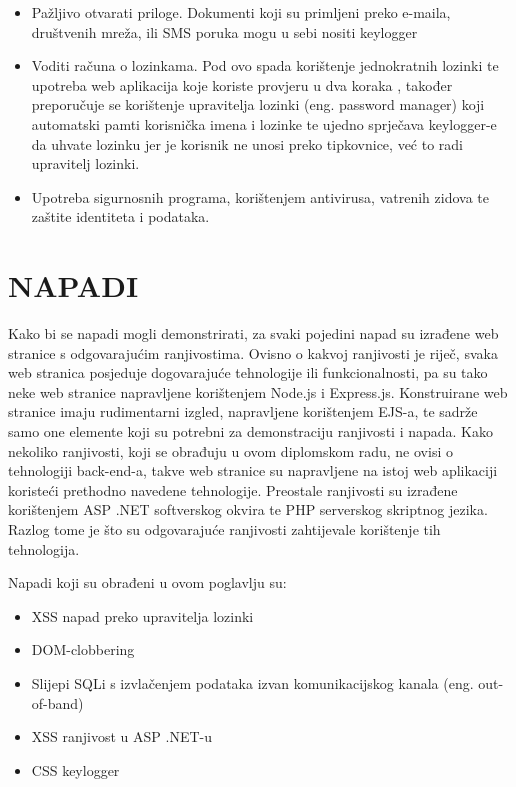 \documentclass[12pt, oneside, onecolumn]{book}
\begin{document}
{\begin{itemize}
\item Pažljivo otvarati priloge. Dokumenti koji su primljeni preko e-maila, društvenih mreža, ili SMS poruka mogu u sebi nositi keylogger
\item Voditi računa o lozinkama. Pod ovo spada korištenje jednokratnih lozinki te upotreba web aplikacija koje koriste provjeru u dva koraka , također preporučuje se korištenje upravitelja lozinki (eng. password manager) koji automatski pamti korisnička imena i lozinke te ujedno sprječava keylogger-e da uhvate lozinku jer je korisnik ne unosi preko tipkovnice, već to radi upravitelj lozinki.
\item Upotreba sigurnosnih programa, korištenjem antivirusa, vatrenih zidova te zaštite identiteta i podataka.
\end{itemize}

\chapter{NAPADI}

Kako bi se napadi mogli demonstrirati, za svaki pojedini napad su izrađene web stranice s odgovarajućim ranjivostima. Ovisno o kakvoj ranjivosti je riječ, svaka web stranica posjeduje dogovarajuće tehnologije ili funkcionalnosti, pa su tako neke web stranice napravljene korištenjem Node.js i Express.js. Konstruirane web stranice imaju rudimentarni izgled, napravljene korištenjem EJS-a, te sadrže samo one elemente koji su potrebni za demonstraciju ranjivosti i napada. Kako nekoliko ranjivosti, koji se obrađuju u ovom diplomskom radu, ne ovisi o tehnologiji back-end-a, takve web stranice su napravljene na istoj web aplikaciji koristeći prethodno navedene tehnologije. Preostale ranjivosti su izrađene korištenjem ASP .NET softverskog okvira te PHP serverskog skriptnog jezika. Razlog tome je što su odgovarajuće ranjivosti zahtijevale korištenje tih tehnologija.

Napadi koji su obrađeni u ovom poglavlju su:

\begin{itemize}
\item XSS napad preko upravitelja lozinki
\item DOM-clobbering
\item Slijepi SQLi s izvlačenjem podataka izvan komunikacijskog kanala (eng. out-of-band)
\item XSS ranjivost u ASP .NET-u
\item CSS keylogger
\end{itemize}

}
\end{document}
